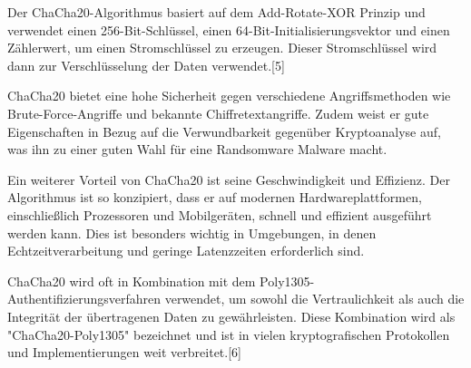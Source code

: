 \documentclass[12pt]{article}
\begin{document}
Der ChaCha20-Algorithmus basiert auf dem Add-Rotate-XOR Prinzip und verwendet einen 256-Bit-Schlüssel, einen 64-Bit-Initialisierungsvektor und einen Zählerwert, um einen Stromschlüssel zu erzeugen. Dieser Stromschlüssel wird dann zur Verschlüsselung der Daten verwendet.[5]

ChaCha20 bietet eine hohe Sicherheit gegen verschiedene Angriffsmethoden wie Brute-Force-Angriffe und bekannte Chiffretextangriffe. Zudem weist er gute Eigenschaften in Bezug auf die Verwundbarkeit gegenüber Kryptoanalyse auf, was ihn zu einer guten Wahl für eine Randsomware Malware macht.

Ein weiterer Vorteil von ChaCha20 ist seine Geschwindigkeit und Effizienz. Der Algorithmus ist so konzipiert, dass er auf modernen Hardwareplattformen, einschließlich Prozessoren und Mobilgeräten, schnell und effizient ausgeführt werden kann. Dies ist besonders wichtig in Umgebungen, in denen Echtzeitverarbeitung und geringe Latenzzeiten erforderlich sind.

ChaCha20 wird oft in Kombination mit dem Poly1305-Authentifizierungsverfahren verwendet, um sowohl die Vertraulichkeit als auch die Integrität der übertragenen Daten zu gewährleisten. Diese Kombination wird als "ChaCha20-Poly1305" bezeichnet und ist in vielen kryptografischen Protokollen und Implementierungen weit verbreitet.[6]
\end{document}
